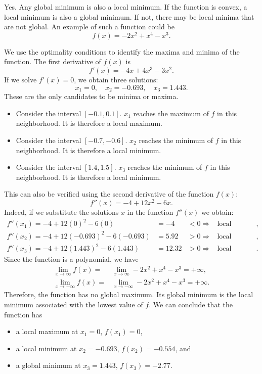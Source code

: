 
 Yes. Any global minimum is also a local minimum. If the function
  is convex, a local minimum is
  also a global minimum. If not, there
  may be local minima that are not global. 
An example of such a function could be
$$f(x)=-2x^2 + x^4 - x^3.$$

\begin{center}
\end{center}
We use the optimality conditions to identify the  maxima and minima of
the function. The first derivative of $f(x)$ is
$$ f'(x)= -4x+4x^3-3x^2.$$
If we solve $f'(x)=0$, we obtain three solutions: $$x_1=0, \quad x_2=-0.693, \quad x_3=1.443.$$
These are the only candidates to be minima or maxima.
\begin{itemize}
\item Consider the interval $[-0.1,0.1]$. $x_1$ reaches the maximum of $f$
in this neighborhood. It is therefore a local maximum. 
\item Consider the interval $[-0.7,-0.6]$. $x_2$ reaches the minimum of $f$
in this neighborhood. It is therefore a local minimum. 
\item Consider the interval $[1.4,1.5]$. $x_3$ reaches the minimum of $f$
in this neighborhood. It is therefore a local minimum. 
\end{itemize}
This can also be verified using the second derivative of the function $f(x)$: 
$$f''(x)=-4+12x^2-6x.$$
Indeed, if we substitute the solutions $x$  in the function $f''(x)$ we obtain:
\begin{align*}
f''(x_1)=-4+12(0)^2-6(0)&=-4 &<   0 \Rightarrow & \text{local maximum},\\
f''(x_2)=-4+12(-0.693)^2-6(-0.693)&=5.92 &>  0 \Rightarrow &
\text{local minimum}, \\
f''(x_3)=-4+12(1.443)^2-6(1.443)&=12.32 &>  0 \Rightarrow &
\text{local minimum}.
\end{align*}
Since the function is a polynomial, we have
\begin{align*}
\lim_{x\to\infty} f(x)=& \lim_{x\to\infty} -2x^2 + x^4 - x^3= + \infty,\\
\lim\limits_{x\to -\infty} f(x)=& \lim\limits_{x\to -\infty} -2x^2 + x^4 - x^3=+ \infty.
\end{align*}
Therefore, the function has no global maximum.
Its global minimum is the local minimum associated with the lowest
value of $f$.
We can conclude that the function has
\begin{itemize}
\item a local maximum at $x_1=0$, $f(x_1)=0$, 
\item a local minimum at $x_2=-0.693$, $f(x_2)=-0.554$, and
\item a global minimum at $x_3=1.443$, $f(x_3)=-2.77$.
\end{itemize}


